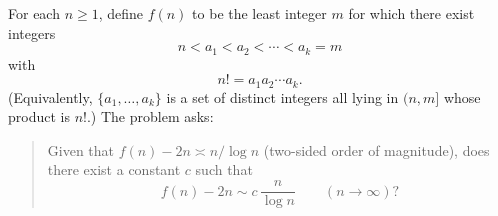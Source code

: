 For each $n\ge 1$, define $f(n)$ to be the least integer $m$ for which there exist integers
\[
 n<a_1<a_2<\cdots<a_k=m
\]
with
\begin{equation}
\label{eq:P390-def}
 n! = a_1 a_2\cdots a_k.
\end{equation}
(Equivalently, $\{a_1,\dots,a_k\}$ is a set of distinct integers all lying in $(n,m]$ whose product is $n!$.)
The problem asks:
\begin{quote}
Given that $f(n)-2n\asymp n/\log n$ (two-sided order of magnitude), does there exist a constant $c$ such that
\[
 f(n)-2n\sim c\,\frac{n}{\log n}\qquad(n\to\infty)?
\]
\end{quote}
